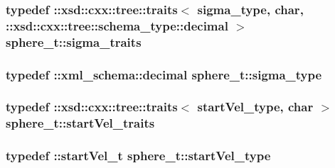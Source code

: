 \hypertarget{classsphere__t_a29db24a7516c6147929d3632d105d976}{
\subsubsection[{sigma\-\_\-traits}]{\setlength{\rightskip}{0pt plus 5cm}typedef \-::xsd\-::cxx\-::tree\-::traits$<$ {\bf sigma\-\_\-type}, char, \-::xsd\-::cxx\-::tree\-::schema\-\_\-type\-::decimal $>$ {\bf sphere\-\_\-t\-::sigma\-\_\-traits}}}\label{classsphere__t_a29db24a7516c6147929d3632d105d976}
\hypertarget{classsphere__t_a20806454a1e5e7f7fb50b22a49aef704}{
\subsubsection[{sigma\-\_\-type}]{\setlength{\rightskip}{0pt plus 5cm}typedef \-::{\bf xml\-\_\-schema\-::decimal} {\bf sphere\-\_\-t\-::sigma\-\_\-type}}}\label{classsphere__t_a20806454a1e5e7f7fb50b22a49aef704}
\hypertarget{classsphere__t_a919a3fc37e88e6c692251a11409658c0}{
\subsubsection[{start\-Vel\-\_\-traits}]{\setlength{\rightskip}{0pt plus 5cm}typedef \-::xsd\-::cxx\-::tree\-::traits$<$ {\bf start\-Vel\-\_\-type}, char $>$ {\bf sphere\-\_\-t\-::start\-Vel\-\_\-traits}}}\label{classsphere__t_a919a3fc37e88e6c692251a11409658c0}
\hypertarget{classsphere__t_a0235d82d12e4f91c5656e8ae64da4ca6}{
\subsubsection[{start\-Vel\-\_\-type}]{\setlength{\rightskip}{0pt plus 5cm}typedef \-::{\bf start\-Vel\-\_\-t} {\bf sphere\-\_\-t\-::start\-Vel\-\_\-type}}}\label{classsphere__t_a0235d82d12e4f91c5656e8ae64da4ca6}


